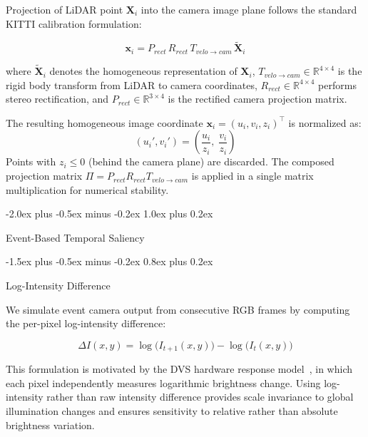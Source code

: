 \documentclass[conference]{IEEEtran}
\makeatletter
\def\section{\@startsection{section}{1}{\z@}
  {-2.0ex plus -0.5ex minus -0.2ex}
  {1.0ex plus 0.2ex}
  {\normalfont\large\bfseries\raggedright}}
\def\subsection{\@startsection{subsection}{2}{\z@}
  {-1.5ex plus -0.5ex minus -0.2ex}
  {0.8ex plus 0.2ex}
  {\normalfont\normalsize\bfseries\raggedright}}
\makeatother
\begin{document}
Projection of LiDAR point $\mathbf{X}_i$ into the camera image plane
follows the standard KITTI calibration formulation:

\begin{equation}
  \mathbf{x}_i = P_{rect}\, R_{rect}\, T_{velo \to cam}\,
  \tilde{\mathbf{X}}_i
  \label{eq:projection}
\end{equation}

where $\tilde{\mathbf{X}}_i$ denotes the homogeneous representation
of $\mathbf{X}_i$, $T_{velo \to cam} \in \mathbb{R}^{4 \times 4}$
is the rigid body transform from LiDAR to camera coordinates,
$R_{rect} \in \mathbb{R}^{4 \times 4}$ performs stereo
rectification, and $P_{rect} \in \mathbb{R}^{3 \times 4}$ is the
rectified camera projection matrix.

The resulting homogeneous image coordinate $\mathbf{x}_i =
(u_i, v_i, z_i)^\top$ is normalized as:
\begin{equation}
  (u_i', v_i') = \left(\frac{u_i}{z_i},\; \frac{v_i}{z_i}\right)
\end{equation}
Points with $z_i \leq 0$ (behind the camera plane) are discarded.
The composed projection matrix $\Pi = P_{rect} R_{rect} T_{velo \to
cam}$ is applied in a single matrix multiplication for numerical
stability.

\section{Event-Based Temporal Saliency}

\subsection{Log-Intensity Difference}

We simulate event camera output from consecutive RGB frames by
computing the per-pixel log-intensity difference:

\begin{equation}
  \Delta I(x,y) = \log\bigl(I_{t+1}(x,y)\bigr) -
  \log\bigl(I_t(x,y)\bigr)
  \label{eq:logdiff}
\end{equation}

This formulation is motivated by the DVS hardware response
model~\cite{gallego2024}, in which each pixel independently measures
logarithmic brightness change. Using log-intensity rather than raw
intensity difference provides scale invariance to global illumination
changes and ensures sensitivity to relative rather than absolute
brightness variation.
\end{document}
